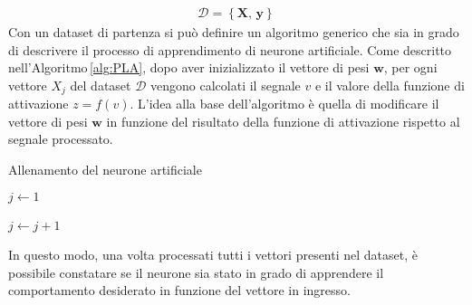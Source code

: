 % 
\begin{gather*}
    \mathcal{D} = \left\{ \mathbf{X},\, \mathbf{y} \right\}  
\end{gather*}
% 
Con un dataset di partenza si può definire un algoritmo generico che sia in grado di descrivere il processo di apprendimento di neurone artificiale. Come descritto nell'Algoritmo\,\ref{alg:PLA}, dopo aver inizializzato il vettore di pesi $\mathbf{w}$, per ogni vettore $X_j$ del dataset $\mathcal{D}$ vengono calcolati il segnale $v$ e il valore della funzione di attivazione $z = f(v)$. L'idea alla base dell'algoritmo è quella di modificare il vettore di pesi $\mathbf{w}$ in funzione del risultato della funzione di attivazione rispetto al segnale processato.
% 
\begin{algorithm}[ht]
    \caption{Allenamento del neurone artificiale}\label{alg:PLA}
    \begin{algorithmic}

        \STATE$j \gets 1$
        
            \STATE{}
            \STATE{}
            \STATE{}
            \STATE$j \gets j + 1$
        \ENDWHILE\,
    \end{algorithmic}
\end{algorithm}
% 
\noindent In questo modo, una volta processati tutti i vettori presenti nel dataset, è possibile constatare se il neurone sia stato in grado di apprendere il comportamento desiderato in funzione del vettore in ingresso.

